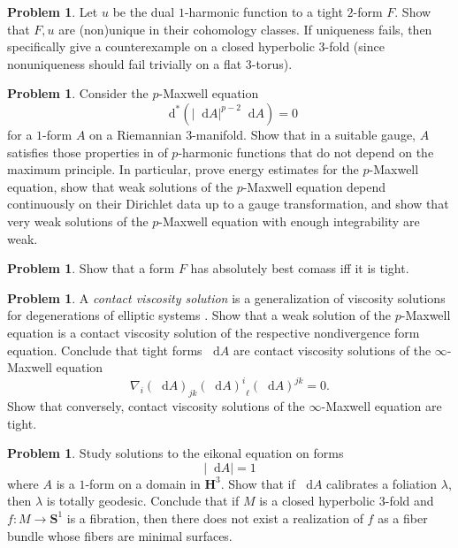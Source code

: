 \documentclass[reqno,11pt]{amsart}
\newcommand{\Hyp}{\mathbf H}
\newcommand{\Sph}{\mathbf S}
\newcommand*\dif{\mathop{}\!\mathrm{d}}
\newcommand{\dfn}[1]{\emph{#1}\index{#1}}
\theoremstyle{definition}
\newtheorem{problem}[theorem]{Problem}
\numberwithin{equation}{section}
\begin{document}
\begin{problem}
Let $u$ be the dual $1$-harmonic function to a tight $2$-form $F$.
Show that $F, u$ are (non)unique in their cohomology classes.
If uniqueness fails, then specifically give a counterexample on a closed hyperbolic $3$-fold (since nonuniqueness should fail trivially on a flat $3$-torus).
\end{problem}

\begin{problem}
Consider the $p$-Maxwell equation 
$$\dif^*(|\dif A|^{p - 2} \dif A) = 0$$
for a $1$-form $A$ on a Riemannian $3$-manifold.
Show that in a suitable gauge, $A$ satisfies those properties in \cite[Chapters 10 and 11]{kinnunen2021maximal} of $p$-harmonic functions that do not depend on the maximum principle.
In particular, prove energy estimates for the $p$-Maxwell equation, show that weak solutions of the $p$-Maxwell equation depend continuously on their Dirichlet data up to a gauge transformation, and show that very weak solutions of the $p$-Maxwell equation with enough integrability are weak.
\end{problem}

\begin{problem}
Show that a form $F$ has absolutely best comass iff it is tight.
\end{problem}

\begin{problem}
A \dfn{contact viscosity solution} is a generalization of viscosity solutions for degenerations of elliptic systems \cite{katzourakis2022vectorvalued}.
Show that a weak solution of the $p$-Maxwell equation is a contact viscosity solution of the respective nondivergence form equation.
Conclude that tight forms $\dif A$ are contact viscosity solutions of the $\infty$-Maxwell equation 
$$\nabla_i (\dif A)_{jk} {(\dif A)^i}_\ell (\dif A)^{jk} = 0.$$
Show that conversely, contact viscosity solutions of the $\infty$-Maxwell equation are tight.
\end{problem}

\begin{problem}
Study solutions to the eikonal equation on forms 
$$|\dif A| = 1$$
where $A$ is a $1$-form on a domain in $\Hyp^3$.
Show that if $\dif A$ calibrates a foliation $\lambda$, then $\lambda$ is totally geodesic.
Conclude that if $M$ is a closed hyperbolic $3$-fold and $f: M \to \Sph^1$ is a fibration, then there does not exist a realization of $f$ as a fiber bundle whose fibers are minimal surfaces.
\end{problem}
\end{document}
